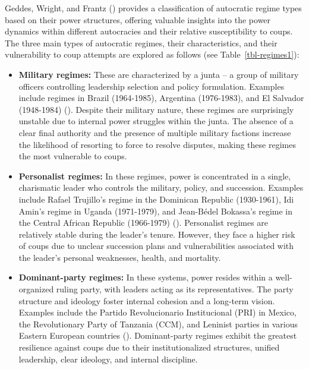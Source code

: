 \documentclass[
  12pt,
]{report}
\begin{document}
Geddes, Wright, and Frantz () provides a
classification of autocratic regime types based on their power
structures, offering valuable insights into the power dynamics within
different autocracies and their relative susceptibility to coups. The
three main types of autocratic regimes, their characteristics, and their
vulnerability to coup attempts are explored as follows (see
Table~\ref{tbl-regimes1}):

\begin{itemize}
\item
  \textbf{Military regimes:} These are characterized by a junta -- a
  group of military officers controlling leadership selection and policy
  formulation. Examples include regimes in Brazil (1964-1985), Argentina
  (1976-1983), and El Salvador (1948-1984)
  (). Despite their military
  nature, these regimes are surprisingly unstable due to internal power
  struggles within the junta. The absence of a clear final authority and
  the presence of multiple military factions increase the likelihood of
  resorting to force to resolve disputes, making these regimes the most
  vulnerable to coups.
\item
  \textbf{Personalist regimes:} In these regimes, power is concentrated
  in a single, charismatic leader who controls the military, policy, and
  succession. Examples include Rafael Trujillo's regime in the Dominican
  Republic (1930-1961), Idi Amin's regime in Uganda (1971-1979), and
  Jean-Bédel Bokassa's regime in the Central African Republic
  (1966-1979) (). Personalist
  regimes are relatively stable during the leader's tenure. However,
  they face a higher risk of coups due to unclear succession plans and
  vulnerabilities associated with the leader's personal weaknesses,
  health, and mortality.
\item
  \textbf{Dominant-party regimes:} In these systems, power resides
  within a well-organized ruling party, with leaders acting as its
  representatives. The party structure and ideology foster internal
  cohesion and a long-term vision. Examples include the Partido
  Revolucionario Institucional (PRI) in Mexico, the Revolutionary Party
  of Tanzania (CCM), and Leninist parties in various Eastern European
  countries (). Dominant-party
  regimes exhibit the greatest resilience against coups due to their
  institutionalized structures, unified leadership, clear ideology, and
  internal discipline.
\end{itemize}
\end{document}
